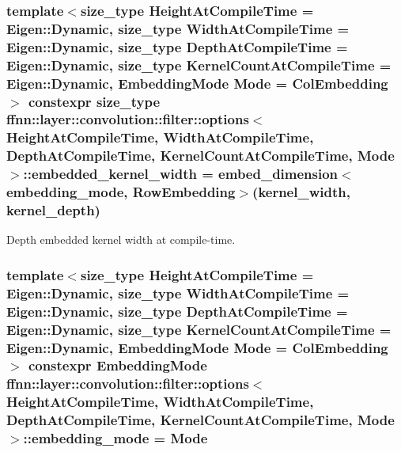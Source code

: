 \hypertarget{structffnn_1_1layer_1_1convolution_1_1filter_1_1options_a9cc6dff082340e5c7388f8878ea3a7f4}{
\subsubsection[{embedded\-\_\-kernel\-\_\-width}]{\setlength{\rightskip}{0pt plus 5cm}template$<$size\-\_\-type Height\-At\-Compile\-Time = Eigen\-::\-Dynamic, size\-\_\-type Width\-At\-Compile\-Time = Eigen\-::\-Dynamic, size\-\_\-type Depth\-At\-Compile\-Time = Eigen\-::\-Dynamic, size\-\_\-type Kernel\-Count\-At\-Compile\-Time = Eigen\-::\-Dynamic, Embedding\-Mode Mode = Col\-Embedding$>$ constexpr {\bf size\-\_\-type} {\bf ffnn\-::layer\-::convolution\-::filter\-::options}$<$ Height\-At\-Compile\-Time, Width\-At\-Compile\-Time, Depth\-At\-Compile\-Time, Kernel\-Count\-At\-Compile\-Time, Mode $>$\-::embedded\-\_\-kernel\-\_\-width = {\bf embed\-\_\-dimension}$<${\bf embedding\-\_\-mode}, {\bf Row\-Embedding}$>$({\bf kernel\-\_\-width}, {\bf kernel\-\_\-depth})\hspace{0.3cm}{\ttfamily [static]}}}\label{structffnn_1_1layer_1_1convolution_1_1filter_1_1options_a9cc6dff082340e5c7388f8878ea3a7f4}


Depth embedded kernel width at compile-\/time. 

\hypertarget{structffnn_1_1layer_1_1convolution_1_1filter_1_1options_a364919ad62fa093fbf5d142bd4f37d6e}{
\subsubsection[{embedding\-\_\-mode}]{\setlength{\rightskip}{0pt plus 5cm}template$<$size\-\_\-type Height\-At\-Compile\-Time = Eigen\-::\-Dynamic, size\-\_\-type Width\-At\-Compile\-Time = Eigen\-::\-Dynamic, size\-\_\-type Depth\-At\-Compile\-Time = Eigen\-::\-Dynamic, size\-\_\-type Kernel\-Count\-At\-Compile\-Time = Eigen\-::\-Dynamic, Embedding\-Mode Mode = Col\-Embedding$>$ constexpr {\bf Embedding\-Mode} {\bf ffnn\-::layer\-::convolution\-::filter\-::options}$<$ Height\-At\-Compile\-Time, Width\-At\-Compile\-Time, Depth\-At\-Compile\-Time, Kernel\-Count\-At\-Compile\-Time, Mode $>$\-::embedding\-\_\-mode = Mode\hspace{0.3cm}{\ttfamily [static]}}}\label{structffnn_1_1layer_1_1convolution_1_1filter_1_1options_a364919ad62fa093fbf5d142bd4f37d6e}


